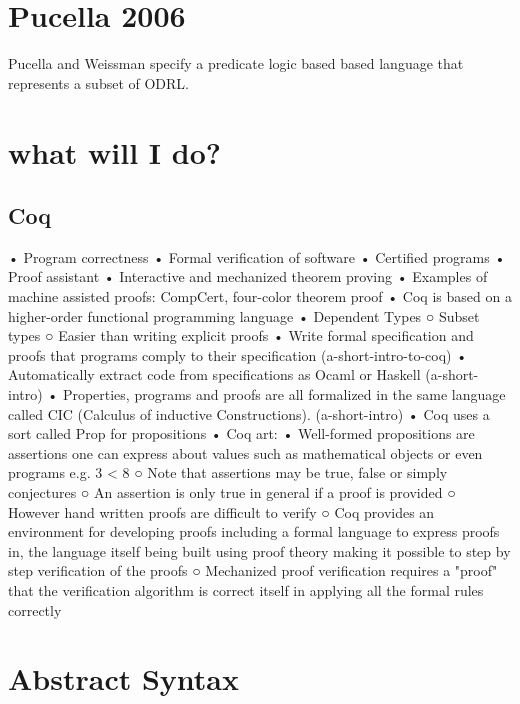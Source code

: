 \section{Pucella 2006}
Pucella and Weissman \cite{pucella2006} specify a predicate logic based based language that represents a subset of ODRL.

\section{what will I do?}


\subsection{Coq}


	• Program correctness
	• Formal verification of software
	• Certified programs
	• Proof assistant
	• Interactive and mechanized theorem proving
	• Examples of machine assisted proofs: CompCert, four-color theorem proof
	• Coq is based on a higher-order functional programming language
	• Dependent Types
		○ Subset types
		○ Easier than writing explicit proofs
	• Write formal specification and proofs that programs comply to their specification (a-short-intro-to-coq)
	• Automatically extract code from specifications as Ocaml or Haskell (a-short-intro)
	• Properties, programs and proofs are all formalized in the same language called CIC (Calculus of inductive Constructions). (a-short-intro)
	• Coq uses a sort called Prop for propositions
	• Coq art:
	• Well-formed propositions are assertions  one can express about values such as mathematical objects or even programs e.g. 3 < 8
		○ Note that assertions may be true, false or simply conjectures
		○ An assertion is only true in general if a proof is provided
		○ However hand written proofs are difficult to verify
		○ Coq provides an environment for developing proofs including a formal language to express proofs in, the language itself being built using proof theory making it possible to step by step verification of the proofs
		○ Mechanized proof verification requires a "proof" that the verification algorithm is correct itself in applying all the formal rules correctly







\section{Abstract Syntax}


